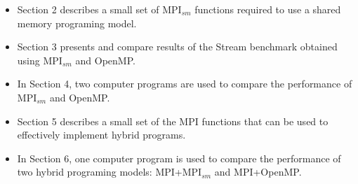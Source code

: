 \begin{itemize} 
\item Section 2 describes a small set of MPI$_{sm}$ functions required to use a shared memory programing model. %

\item Section 3 presents and compare results of the Stream benchmark obtained using MPI$_{sm}$ and OpenMP.

\item In Section 4, two computer programs are used to compare the performance of MPI$_{sm}$ and OpenMP.

\item Section 5 describes a small set of the MPI functions that can be used to effectively implement hybrid programs.

\item In Section 6, one computer program is used to compare the performance of two hybrid programing models: MPI+MPI$_{sm}$ and MPI+OpenMP.


\end{itemize}








